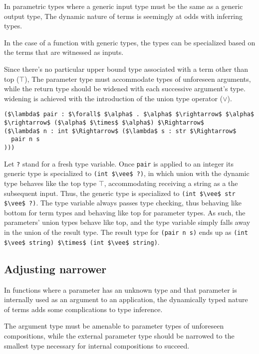 \documentclass[sigplan,screen]{acmart}
\begin{document}
In parametric types where a generic input type must be the same as a generic output type,
The dynamic nature of terms is seemingly at odds with inferring types.

In the case of a function with generic types, 
the types can be specialized based on the terms that are witnessed as inputs. 

Since there's no particular upper bound type associated with 
a term other than top ($\top$), 
The parameter type must accommodate types of unforeseen arguments, 
while the return type should be widened with each successive
argument's type.
widening is achieved with the introduction of the union type operator ($\vee$).

\begin{lstlisting}
($\lambda$ pair : $\forall$ $\alpha$ . $\alpha$ $\rightarrow$ $\alpha$ $\rightarrow$ ($\alpha$ $\times$ $\alpha$) $\Rightarrow$ 
($\lambda$ n : int $\Rightarrow$ ($\lambda$ s : str $\Rightarrow$ 
  pair n s
)))
\end{lstlisting}

Let \lstinline{?} stand for a fresh type variable.
Once \lstinline{pair} is applied to an integer its generic type is specialized to 
\lstinline{(int $\vee$ ?)}, 
in which union with the dynamic type behaves like the top type $\top$, 
accommodating receiving a string as a the subsequent input.
Thus, the generic type is specialized to 
\newline
\lstinline{(int $\vee$ str $\vee$ ?)}.
The type variable always passes type checking, 
thus behaving like bottom for term types
and behaving like top for parameter types.
As such, the parameters' union types behave like top,
and the type variable simply falls away in the union of the result type. 
The result type for \lstinline{(pair n s)} ends up as 
\newline
\lstinline{(int $\vee$ string) $\times$ (int $\vee$ string)}. 

\subsection{Adjusting narrower}

In functions where a parameter has an unknown type and that parameter is 
internally used as an argument to an application, the dynamically typed 
nature of terms adds some complications to type inference.

The argument type must be amenable to parameter types 
of unforeseen compositions,
while the external parameter type should be narrowed 
to the smallest type necessary for internal compositions to
succeed.
\end{document}
